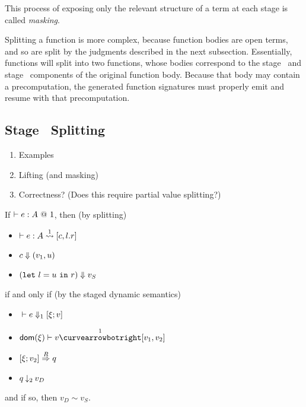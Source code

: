 This process of exposing only the relevant structure of a term at each stage is
called \emph{masking}.

Splitting a function is more complex, because function bodies are open terms,
and so are split by the judgments described in the next subsection. Essentially,
functions will split into two functions, whose bodies correspond to the stage
\bbone\ and stage \bbtwo\ components of the original function body.
Because that body may contain a precomputation, the generated function signatures must properly emit and resume with that precomputation.




\subsection{Stage \bbone\ Splitting}


\TODO
\begin{enumerate}
\item Examples
\item Lifting (and masking)
\item Correctness? (Does this require partial value splitting?)
\end{enumerate}

\begin{theorem}
If $\vdash e:A~@~\bbone$, then (by splitting)
\begin{itemize}
\item $\vdash e : A \splitonesym [c,l.r]$
\item $\reduce {c} {(v_1,u)}$
\item $\reduce {(\letin{l}{u}{r})} v_S$
\end{itemize}
if and only if (by the staged dynamic semantics)
\begin{itemize}
\item $\diaone [] e {\xi;v}$
\item $\dom \xi \vdash v \vsplito [v_1,v_2]$
\item $\reify \xi{v_2}q$
\item $q \mathbin{\tworedsym} v_D$
\end{itemize}
and if so, then $v_D \sim v_S$.
\end{theorem}

